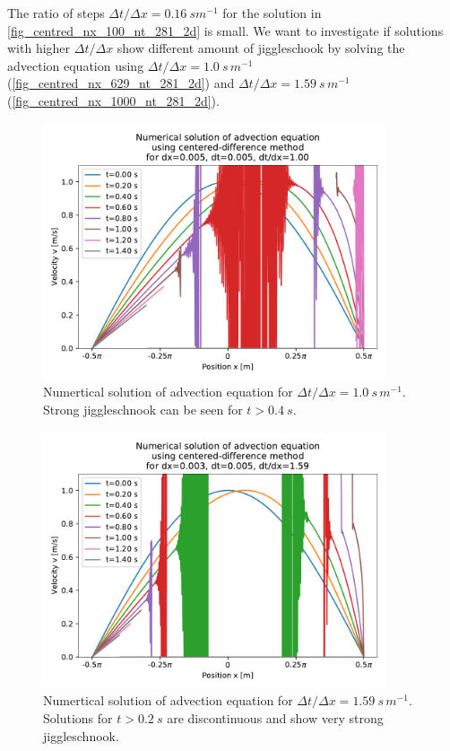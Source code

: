 The ratio of steps $\Delta t / \Delta x = 0.16 \ s m^{-1}$ for the solution in \autoref{fig_centred_nx_100_nt_281_2d} is small. We want to investigate if solutions with higher $\Delta t / \Delta x$ show different amount of jiggleschook by solving the advection equation using $\Delta t / \Delta x = 1.0 \ s \, m^{-1}$ (\autoref{fig_centred_nx_629_nt_281_2d}) and $\Delta t / \Delta x = 1.59 \ s \, m^{-1}$ (\autoref{fig_centred_nx_1000_nt_281_2d}).
\begin{figure}[H]
  \centering
  \includegraphics[width=0.9\textwidth]{figures/numerical/centred_nx_629_nt_281_2d.pdf}
  \vspace*{-15mm}
  \caption{Numertical solution of advection equation for $\Delta t / \Delta x = 1.0 \ s \, m^{-1}$. Strong jiggleschnook can be seen for $t > 0.4 \ s$.}
  \label{fig_centred_nx_629_nt_281_2d}
  \vspace*{-10mm}
\end{figure}
\begin{figure}[H]
  \centering
  \includegraphics[width=0.9\textwidth]{figures/numerical/centred_nx_1000_nt_281_2d.pdf}
  \vspace*{-5mm}
  \caption{Numertical solution of advection equation for $\Delta t / \Delta x = 1.59 \ s \, m^{-1}$. Solutions for $t > 0.2 \ s$ are discontinuous and show very strong jiggleschnook.}
  \label{fig_centred_nx_1000_nt_281_2d}
  \vspace*{-10mm}
\end{figure}


